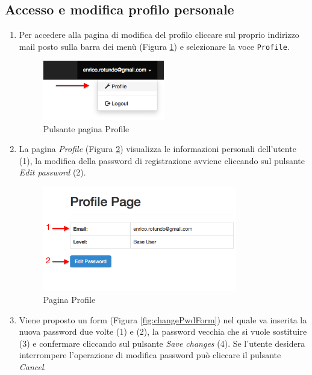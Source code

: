 	\clearpage
	\subsection{Accesso e modifica profilo personale}
		\label{modificaprofilo}
		\begin{enumerate}

			\item Per accedere alla pagina di modifica del profilo cliccare sul proprio indirizzo mail posto sulla barra dei menù (Figura \ref{fig:profileButton}) e selezionare la voce \texttt{Profile}.

			\begin{figure}[H]
				\centering \includegraphics[width=0.5\textwidth]{img/profileButton.png}
			\caption{ \label{fig:profileButton} Pulsante pagina Profile}
			\end{figure}

			\item La pagina \emph{Profile} (Figura \ref{fig:showProfile}) visualizza le informazioni personali dell'utente (1), la modifica della password di registrazione avviene cliccando sul pulsante \emph{Edit password} (2).

			\begin{figure}[H]
				\centering \includegraphics[width=0.8\textwidth]{img/showProfile.png}
			\caption{ \label{fig:showProfile} Pagina Profile}
			\end{figure}

			\item Viene proposto un form (Figura \ref{fig:changePwdForm}) nel quale va inserita la nuova password due volte (1) e (2), la password vecchia che si vuole sostituire (3) e confermare cliccando sul pulsante \emph{Save changes} (4). Se l'utente desidera interrompere l'operazione di modifica password può cliccare il pulsante \emph{Cancel}.


\end{enumerate}
